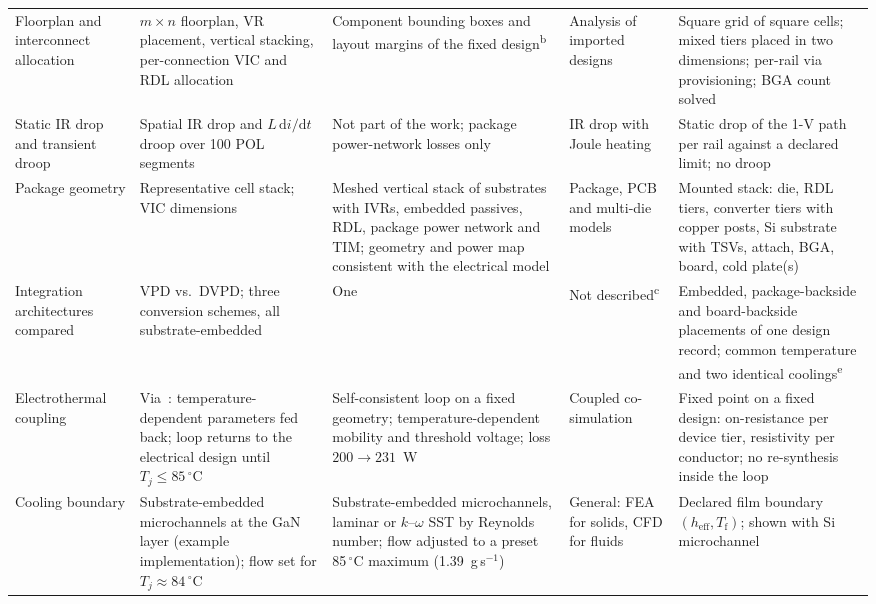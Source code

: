 \begin{longtable}{@{}L{2.25cm}L{3.70cm}L{3.15cm}L{2.80cm}L{4.75cm}@{}}
Floorplan and interconnect allocation
 & $m\times n$ floorplan, VR placement, vertical stacking, per-connection VIC and RDL
   allocation
 & Component bounding boxes and layout margins of the fixed design\textsuperscript{b}
 & Analysis of imported designs~\cite{Cadence_Celsius}
 & Square grid of square cells; mixed tiers placed in two dimensions; per-rail via
   provisioning; BGA count solved \\
Static IR drop and transient droop
 & Spatial IR drop and $L\,\mathrm{d}i/\mathrm{d}t$ droop over 100 POL segments
 & Not part of the work; package power-network losses only
 & IR drop with Joule heating~\cite{Cadence_Celsius}
 & Static drop of the 1-V path per rail against a declared limit; no droop \\
Package geometry
 & Representative cell stack; VIC dimensions~\cite{Krishnakumar2026DVPD}
 & Meshed vertical stack of substrates with IVRs, embedded passives, RDL, package power network
   and TIM; geometry and power map consistent with the electrical model
 & Package, PCB and multi-die models~\cite{Synopsys_RedHawkSC_ET,Cadence_Celsius}
 & Mounted stack: die, RDL tiers, converter tiers with copper posts, Si substrate with TSVs,
   attach, BGA, board, cold plate(s) \\
Integration architectures compared
 & VPD vs.\ DVPD; three conversion schemes, all substrate-embedded
 & One
 & Not described\textsuperscript{c}
 & Embedded, package-backside and board-backside placements of one design record; common
   temperature and two identical coolings\textsuperscript{e} \\
Electrothermal coupling
 & Via~\cite{Choi2025SelfConsistent,Choi2025AutoET}: temperature-dependent parameters fed back;
   loop returns to the electrical design until $T_j\le85\,^\circ$C
 & Self-consistent loop on a fixed geometry; temperature-dependent mobility and threshold voltage;
   loss $200\to231$~W
 & Coupled co-simulation~\cite{Synopsys_RedHawkSC_ET,Cadence_Celsius}
 & Fixed point on a fixed design: on-resistance per device tier, resistivity per conductor; no
   re-synthesis inside the loop \\
Cooling boundary
 & Substrate-embedded microchannels at the GaN layer (example implementation); flow set for
   $T_j\approx84\,^\circ$C
 & Substrate-embedded microchannels, laminar or $k$--$\omega$ SST by Reynolds number; flow adjusted
   to a preset 85\,$^\circ$C maximum (1.39~g\,s$^{-1}$)
 & General: FEA for solids, CFD for fluids~\cite{Cadence_Celsius}
 & Declared film boundary $(h_{\mathrm{eff}},T_{\mathrm{f}})$; shown with Si microchannel

\end{longtable}
